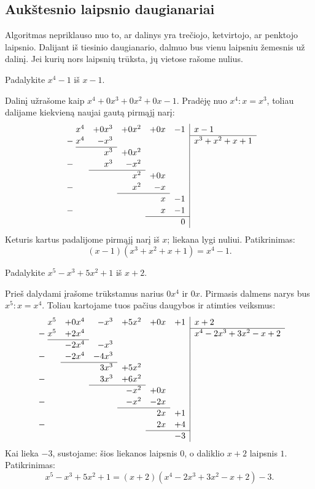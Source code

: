 \documentclass[11pt,a4paper]{scrartcl}
\begin{document}
\subsection{Aukštesnio laipsnio daugianariai}
Algoritmas nepriklauso nuo to, ar dalinys yra trečiojo, ketvirtojo, ar penktojo laipsnio. Dalijant iš tiesinio daugianario, dalmuo bus vienu laipsniu žemesnis už dalinį. Jei kurių nors laipsnių trūksta, jų vietose rašome nulius.
\begin{example}
Padalykite \(x^4-1\) iš \(x-1\).
\end{example}
\begin{solution}
Dalinį užrašome kaip \(x^4+0x^3+0x^2+0x-1\). Pradėję nuo \(x^4:x=x^3\), toliau dalijame kiekvieną naujai gautą pirmąjį narį:
\[
\renewcommand{\arraystretch}{1.12}
\begin{array}{r@{\;}rrrrr|l}
 &x^4&+0x^3&+0x^2&+0x&-1&x-1\\\cline{7-7}
 -&x^4&-x^3&&&&x^3+x^2+x+1\\\cline{2-3}
 &&x^3&+0x^2&&&\\
 -&&x^3&-x^2&&&\\\cline{3-4}
 &&&x^2&+0x&&\\
 -&&&x^2&-x&&\\\cline{4-5}
 &&&&x&-1&\\
 -&&&&x&-1&\\\cline{5-6}
 &&&&&0&
\end{array}
\]
Keturis kartus padalijome pirmąjį narį iš \(x\); liekana lygi nuliui. Patikrinimas:
\[(x-1)(x^3+x^2+x+1)=x^4-1.\]
\end{solution}
\begin{example}
Padalykite \(x^5-x^3+5x^2+1\) iš \(x+2\).
\end{example}
\begin{solution}
Prieš dalydami įrašome trūkstamus narius \(0x^4\) ir \(0x\). Pirmasis dalmens narys bus \(x^5:x=x^4\). Toliau kartojame tuos pačius daugybos ir atimties veiksmus:
\[
\renewcommand{\arraystretch}{1.1}
\begin{array}{r@{\;}rrrrrr|l}
 &x^5&+0x^4&-x^3&+5x^2&+0x&+1&x+2\\\cline{8-8}
 -&x^5&+2x^4&&&&&x^4-2x^3+3x^2-x+2\\\cline{2-3}
 &&-2x^4&-x^3&&&&\\
 -&&-2x^4&-4x^3&&&&\\\cline{3-4}
 &&&3x^3&+5x^2&&&\\
 -&&&3x^3&+6x^2&&&\\\cline{4-5}
 &&&&-x^2&+0x&&\\
 -&&&&-x^2&-2x&&\\\cline{5-6}
 &&&&&2x&+1&\\
 -&&&&&2x&+4&\\\cline{6-7}
 &&&&&&-3&
\end{array}
\]
Kai lieka \(-3\), sustojame: šios liekanos laipsnis \(0\), o daliklio \(x+2\) laipsnis \(1\). Patikrinimas:
\[x^5-x^3+5x^2+1=(x+2)(x^4-2x^3+3x^2-x+2)-3.\]
\end{solution}
\end{document}
